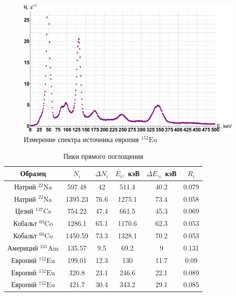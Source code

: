 \documentclass[12pt]{kiarticle}
\begin{document}
\begin{figure}[H]
	\label{graf_eu}
	\includegraphics[scale=0.5]{eu.pdf}
	\caption{Измерение спектра источника европия $ \mathrm{^{152}Eu} $}
\end{figure} 
	
	
	\begin{table}[H]
		\caption{Пики прямого поглощения}
		\begin{center}
			\begin{tabular}{|c|c|c|c|c|c|}
				\hline 
				Образец & $N_i $ & $ \Delta N_i $ & $ E_i, $ кэВ & $ \Delta E,_i $ кэВ  & $ R_i $ \\ 
				\hline 
				Натрий $ \mathrm{^{22}Na} $ & 597.48 & 42 & 511.4 & 40.2 & 0.079 \\
				Натрий $ \mathrm{^{22}Na} $& 1395.23 & 76.6 & 1275.1 & 73.4 & 0.058 \\
				Цезий $ \mathrm{^{137}Cs} $ & 754.22 & 47.4 & 661.5 & 45.3 & 0.069 \\
				Кобальт $ \mathrm{^{60}Co} $ & 1286.1 & 65.1 & 1170.6 & 62.3 & 0.053 \\
				Кобальт $ \mathrm{^{60}Co} $ & 1450.59 & 73.3 & 1328.1 & 70.2 & 0.053 \\
				Америций $ \mathrm{^{241}Am} $& 135.57 & 9.5 & 69.2 & 9 & 0.131 \\
				Европий	 $ \mathrm{^{152}Eu} $& 199.01 & 12.3 & 130 & 11.7 & 0.09 \\
								Европий	 $ \mathrm{^{152}Eu} $& 320.8	& 23.1	&		246.6 & 22.1 & 0.089 \\
					Европий	 $ \mathrm{^{152}Eu} $& 421.7 & 30.4 & 343.2 & 29.1 & 0.085 \\
				

				\hline 
			\end{tabular} 
		\end{center}
		\label{res}
	\end{table}
\end{document}

